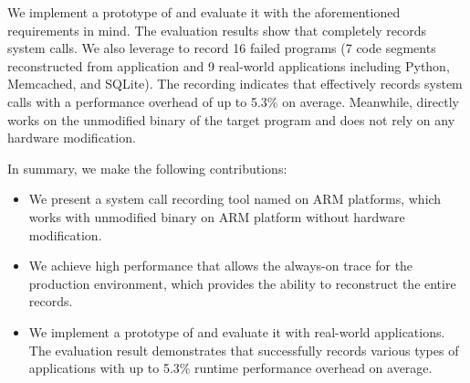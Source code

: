 We implement a prototype of \TheName{} and evaluate it with the 
aforementioned requirements in mind. The evaluation results show that
\TheName{} completely records system calls. 
We also leverage \TheName to record 16 failed programs (7 code segments 
reconstructed from application and 9 real-world applications including Python, Memcached, and SQLite). The recording indicates that \TheName effectively records system calls
 with a performance overhead of
up to 5.3\% on average. Meanwhile, \TheName{} directly works on the unmodified binary of the target 
program and does not rely on any hardware modification.



In summary, we make the following contributions:
\begin{itemize}
    \item We present a system call recording tool named \TheName{} on ARM platforms, which 
     works with
    unmodified binary on ARM platform without hardware modification.
    \item We achieve high performance that allows the
    always-on trace for the production environment, which provides \TheName{} the ability
    to reconstruct the entire records.
    \item We implement a prototype of \TheName{} and evaluate it with
    real-world applications.
    The evaluation result demonstrates that \TheName{} successfully records
    various types of applications with up to 5.3\% runtime
    performance overhead on average.
  \end{itemize}
  